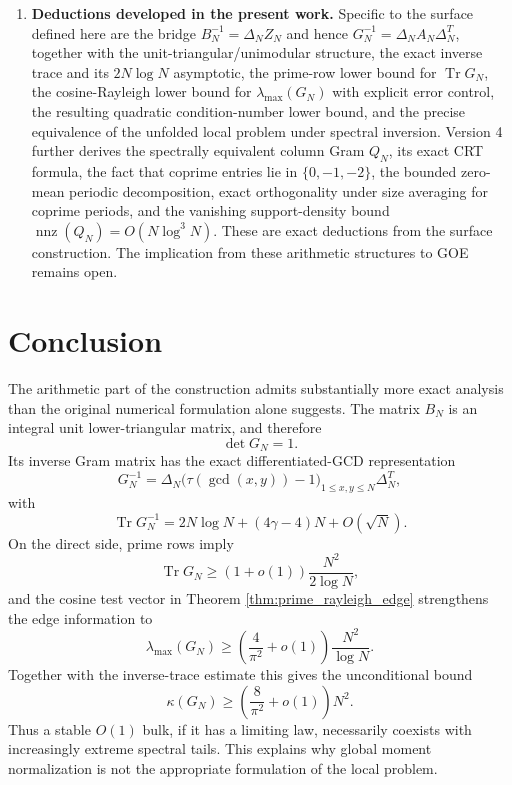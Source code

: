 \documentclass[11pt]{amsart}
\numberwithin{equation}{section}
\theoremstyle{plain}
\theoremstyle{definition}
\theoremstyle{remark}
\newcommand{\Tr}{\operatorname{Tr}}
\begin{document}
\begin{enumerate}[label=(\roman*)]
\item \textbf{Deductions developed in the present work.}
Specific to the surface defined here are the bridge $B_N^{-1}=\Delta_NZ_N$ and hence $G_N^{-1}=\Delta_NA_N\Delta_N^T$, together with the unit-triangular/unimodular structure, the exact inverse trace and its $2N\log N$ asymptotic, the prime-row lower bound for $\Tr G_N$, the cosine-Rayleigh lower bound for $\lambda_{\max}(G_N)$ with explicit error control, the resulting quadratic condition-number lower bound, and the precise equivalence of the unfolded local problem under spectral inversion.  Version 4 further derives the spectrally equivalent column Gram $Q_N$, its exact CRT formula, the fact that coprime entries lie in $\{0,-1,-2\}$, the bounded zero-mean periodic decomposition, exact orthogonality under size averaging for coprime periods, and the vanishing support-density bound $\operatorname{nnz}(Q_N)=O(N\log^3N)$.  These are exact deductions from the surface construction.  The implication from these arithmetic structures to GOE remains open.
\end{enumerate}

\section{Conclusion}
\label{sec:conclusion}

The arithmetic part of the construction admits substantially more exact analysis than the original numerical formulation alone suggests.  The matrix $B_N$ is an integral unit lower-triangular matrix, and therefore
\begin{equation}
\det G_N=1.
\end{equation}
Its inverse Gram matrix has the exact differentiated-GCD representation
\begin{equation}
G_N^{-1}=\Delta_N
\bigl(\tau(\gcd(x,y))-1\bigr)_{1\le x,y\le N}
\Delta_N^T,
\end{equation}
with
\begin{equation}
\Tr G_N^{-1}
=2N\log N+(4\gamma-4)N+O(\sqrt N).
\end{equation}
On the direct side, prime rows imply
\begin{equation}
\Tr G_N\ge(1+o(1))\frac{N^2}{2\log N},
\end{equation}
and the cosine test vector in Theorem \ref{thm:prime_rayleigh_edge} strengthens the edge information to
\begin{equation}
\lambda_{\max}(G_N)
\ge\left(\frac4{\pi^2}+o(1)\right)\frac{N^2}{\log N}.
\end{equation}
Together with the inverse-trace estimate this gives the unconditional bound
\begin{equation}
\kappa(G_N)
\ge\left(\frac8{\pi^2}+o(1)\right)N^2.
\end{equation}
Thus a stable $O(1)$ bulk, if it has a limiting law, necessarily coexists with increasingly extreme spectral tails.  This explains why global moment normalization is not the appropriate formulation of the local problem.
\end{document}
